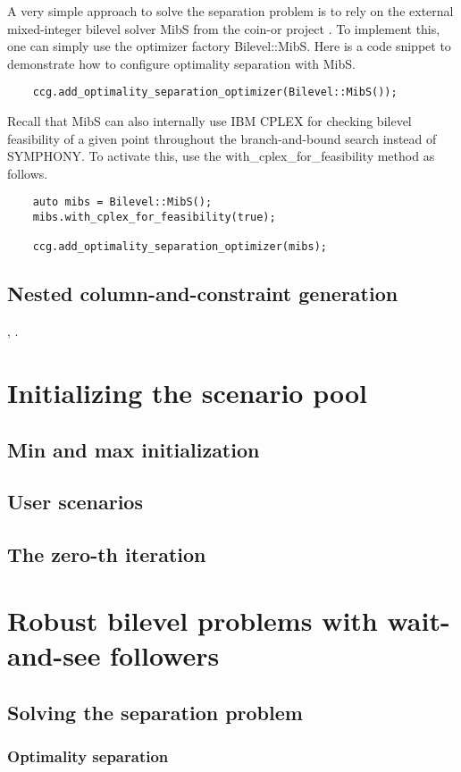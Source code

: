 A very simple approach to solve the separation problem is to rely on the
external mixed-integer bilevel solver \textsf{MibS} from the \textsf{coin-or}
project \parencite{Tahernejad2020}. To implement this, one can simply use the
optimizer factory \textsf{Bilevel::MibS}. Here is a code snippet to
demonstrate how to configure optimality separation with \textsf{MibS}.
%
\begin{lstlisting}
    ccg.add_optimality_separation_optimizer(Bilevel::MibS());
\end{lstlisting}

Recall that \textsf{MibS} can also internally use \textsf{IBM CPLEX} for
checking bilevel feasibility of a given point throughout the branch-and-bound
search instead of \textsf{SYMPHONY}. To activate this, use the
\textsf{with\_cplex\_for\_feasibility} method as follows.
%
\begin{lstlisting}
    auto mibs = Bilevel::MibS();
    mibs.with_cplex_for_feasibility(true);

    ccg.add_optimality_separation_optimizer(mibs);
\end{lstlisting}

\subsection{Nested column-and-constraint generation}

\textcite{Subramanyam2022}, \textcite{lefebvre2025correctiontolagrangiandual}.


\section{Initializing the scenario pool}
\label{sec:ccg:initial-scenario}

\subsection{Min and max initialization}


\subsection{User scenarios}


\subsection{The zero-th iteration}


\section{Robust bilevel problems with wait-and-see followers}


\subsection{Solving the separation problem}

\subsubsection{Optimality separation}
